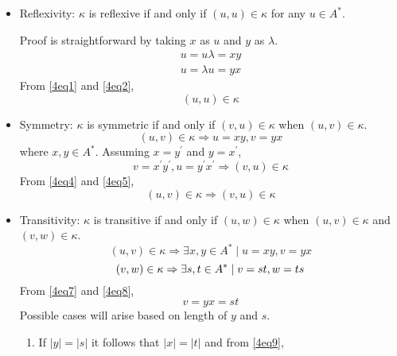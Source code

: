 \begin{itemize}
\item Reflexivity: $\kappa$ is reflexive if and only if $\left( u,u \right) \in \kappa$ for any $u \in A^*$.

Proof is straightforward by taking $x$ as $u$ and $y$ as $\lambda$.
\begin{eqnarray}
u = u\lambda = xy \label{4eq1}\\
u = \lambda u = yx \label{4eq2}
\end{eqnarray}
From \eqref{4eq1} and \eqref{4eq2},
\begin{equation}\label{4eq3}
\left( u,u \right) \in \kappa
\end{equation}
\item Symmetry: $\kappa$ is symmetric if and only if $\left(v,u\right) \in \kappa$ when $\left( u,v \right) \in \kappa$.
\begin{equation}\label{4eq4}
\left( u,v \right) \in \kappa \Rightarrow u = xy, v = yx
\end{equation}
where $x,y \in A^*$. Assuming $x = y^\prime$ and $y = x^\prime$,
\begin{equation}\label{4eq5}
v = x^\prime y^\prime, u = y^\prime x^\prime \Rightarrow \left( v,u \right) \in \kappa
\end{equation}
From \eqref{4eq4} and \eqref{4eq5},
\begin{equation}\label{4eq6}
\left( u,v \right) \in \kappa \Rightarrow \left( v,u \right) \in \kappa
\end{equation}
\item Transitivity: $\kappa$ is transitive if and only if $\left( u,w \right) \in \kappa$ when $\left( u,v \right)\in \kappa$ and $\left( v,w \right) \in \kappa$.
\begin{equation}\label{4eq7}
\left( u , v \right) \in \kappa \Rightarrow \exists x,y \in A^* \mid u = xy, v = yx
\end{equation}
\begin{equation}\label{4eq8}
\left( v , w \right) \in \kappa \Rightarrow \exists s,t \in A^* \mid v = st, w = ts\\
\end{equation}
From \eqref{4eq7} and \eqref{4eq8},
\begin{equation}\label{4eq9}
v = yx = st
\end{equation}
Possible cases will arise based on length of $y$ and $s$.
\begin{enumerate}
\item If $|y| = |s|$ it follows that $|x| = |t|$ and from \eqref{4eq9},

\end{enumerate}
\end{itemize}
